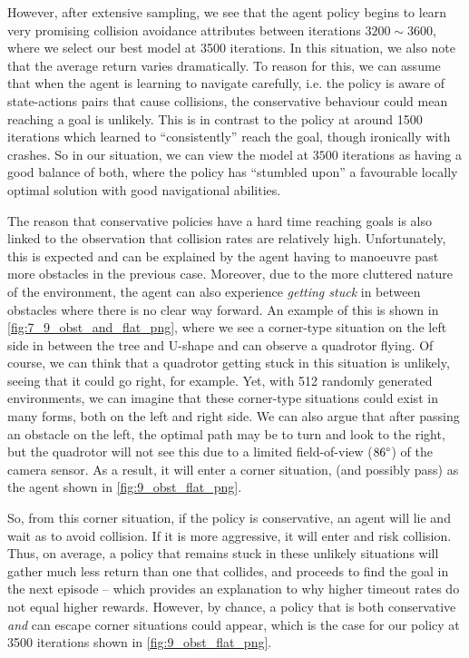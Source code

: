 However, after extensive sampling, we see that the agent policy begins to learn very promising collision avoidance attributes between iterations $3200 \sim 3600$, where we select our best model at 3500 iterations. In this situation, we also note that the average return varies dramatically. To reason for this, we can assume that when the agent is learning to navigate carefully, i.e. the policy is aware of state-actions pairs that cause collisions, the conservative behaviour could mean reaching a goal is unlikely. This is in contrast to the policy at around 1500 iterations which learned to ``consistently'' reach the goal, though ironically with crashes. So in our situation, we can view the model at $3500$ iterations as having a good balance of both, where the policy has ``stumbled upon'' a favourable locally optimal solution with good navigational abilities.

The reason that conservative policies have a hard time reaching goals is also linked to the observation that collision rates are relatively high. Unfortunately, this is expected and can be explained by the agent having to manoeuvre past more obstacles in the previous case. Moreover, due to the more cluttered nature of the environment, the agent can also experience \textit{getting stuck} in between obstacles where there is no clear way forward.
An example of this is shown in \cref{fig:7_9_obst_and_flat_png}, where we see a corner-type situation on the left side in between the tree and U-shape and can observe a quadrotor flying. Of course, we can think that a quadrotor getting stuck in this situation is unlikely, seeing that it could go right, for example. Yet, with 512 randomly generated environments, we can imagine that these corner-type situations could exist in many forms, both on the left and right side. We can also argue that after passing an obstacle on the left, the optimal path may be to turn and look to the right, but the quadrotor will not see this due to a limited field-of-view ($86\degree$) of the camera sensor. As a result, it will enter a corner situation, (and possibly pass) as the agent shown in \cref{fig:9_obst_flat_png}. 

So, from this corner situation, if the policy is conservative, an agent will lie and wait as to avoid collision. If it is more aggressive, it will enter and risk collision. Thus, on average, a policy that remains stuck in these unlikely situations will gather much less return than one that collides, and proceeds to find the goal in the next episode -- which provides an explanation to why higher timeout rates do not equal higher rewards. However, by chance, a policy that is both conservative \textit{and} can escape corner situations could appear, which is the case for our policy at 3500 iterations shown in \cref{fig:9_obst_flat_png}.


